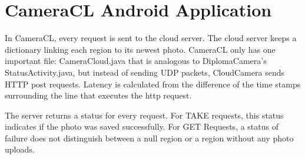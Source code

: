 \chapter{CameraCL Android Application}

In CameraCL, every request is sent to the cloud server. The cloud server keeps a dictionary linking each region to its newest photo.  CameraCL only has one important file: CameraCloud.java that is analogous to DiplomaCamera’s StatusActivity.java, but instead of sending UDP packets, CloudCamera sends HTTP post requests. Latency is calculated from the difference of the time stamps surrounding the line that executes the http request.

The server returns a status for every request. For TAKE requests, this status indicates if the photo was saved successfully. For GET Requests, a status of failure does not distinguish between a null region or a region without any photo uploads.